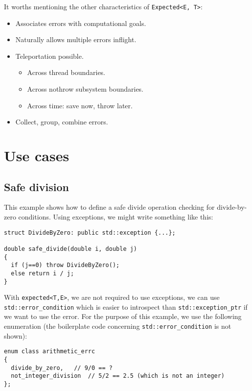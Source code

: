 \documentclass[a4paper,10pt]{article}
\newcommand{\cpp}[1]{\lstinline{#1}}
\begin{document}
\noindent
It worths mentioning the other characteristics of \cpp{Expected<E, T>}:

\begin{itemize}
 \item Associates errors with computational goals.
 \item Naturally allows multiple errors inflight.
 \item Teleportation possible.
 \begin{itemize}
  \item Across thread boundaries.
  \item Across nothrow subsystem boundaries.
  \item Across time: save now, throw later.
 \end{itemize}
 \item Collect, group, combine errors.
\end{itemize}

\section{Use cases}

\subsection{Safe division}
\label{divide-example}

This example shows how to define a safe divide operation checking for divide-by-zero conditions. Using exceptions, we might write something like this:

\begin{lstlisting}
struct DivideByZero: public std::exception {...};

double safe_divide(double i, double j)
{
  if (j==0) throw DivideByZero();
  else return i / j;
}
\end{lstlisting}

With \cpp{expected<T,E>}, we are not required to use exceptions, we can use \cpp{std::error_condition} which is easier to introspect than \cpp{std::exception_ptr} if we want to use the error. For the purpose of this example, we use the following enumeration (the boilerplate code concerning \cpp{std::error_condition} is not shown):

\begin{lstlisting}
enum class arithmetic_errc
{
  divide_by_zero,   // 9/0 == ?
  not_integer_division  // 5/2 == 2.5 (which is not an integer)
};
\end{lstlisting}
\end{document}
